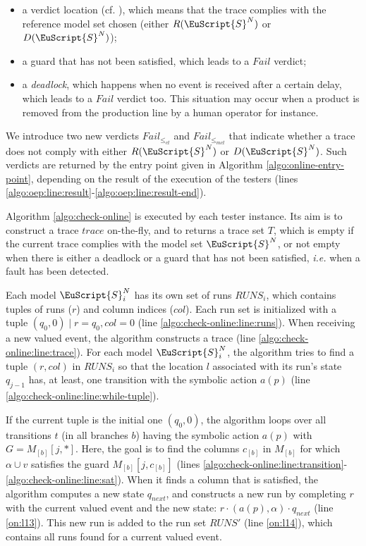 \begin{itemize}
    \item a verdict location (cf.
        ), which means
        that the trace complies with the reference model set
        chosen (either $R(\EuScript{S}^N)$ or
        $D(\EuScript{S}^N)$);

    \item a guard that has not been satisfied, which leads to a
        $Fail$ verdict;

    \item a \emph{deadlock}, which happens when no event is
        received after a certain delay, which leads to a $Fail$
        verdict too. This situation may occur when a product is
        removed from the production line by a human operator for
        instance.
\end{itemize}

We introduce two new verdicts $Fail_{\leq_{ct}}$ and
$Fail_{\leq_{mct}}$ that indicate whether a trace does not comply
with either $R(\EuScript{S}^N)$ or $D(\EuScript{S}^N)$. Such
verdicts are returned by the entry point given in Algorithm
\ref{algo:online-entry-point}, depending on the result of the
execution of the testers (lines
\ref{algo:oep:line:result}-\ref{algo:oep:line:result-end}).

Algorithm \ref{algo:check-online} is executed by each tester
instance. Its aim is to construct a trace $trace$ on-the-fly, and
to returns a trace set $T$, which is empty if the current trace
complies with the model set $\EuScript{S}^N$, or not empty when
there is either a deadlock or a guard that has not been
satisfied, \emph{i.e.} when a fault has been detected.

Each model $\EuScript{S}_i^N$ has its own set of runs $RUNS_i$,
which contains tuples of runs ($r$) and column indices ($col$).
Each run set is initialized with a tuple $(q_0, 0) \mid r = q_0,
col = 0$ (line \ref{algo:check-online:line:runs}). When receiving
a new valued event, the algorithm constructs a trace (line
\ref{algo:check-online:line:trace}). For each model
$\EuScript{S}_i^N$, the algorithm tries to find a tuple $(r,
col)$ in $RUNS_i$ so that the location $l$ associated with its
run's state $q_{j - 1}$ has, at least, one transition with the
symbolic action $a(p)$ (line
\ref{algo:check-online:line:while-tuple}).

If the current tuple is the initial one $(q_0, 0)$,
the algorithm loops over all transitions $t$ (in all branches
$b$) having the symbolic action $a(p)$ with $G = M_{[b]}[j, *]$.
Here, the goal is to find the columns $c_{[b]}$ in $M_{[b]}$ for
which $\alpha \cup v$ satisfies the guard $M_{[b]}[j, c_{[b]}]$
(lines
\ref{algo:check-online:line:transition}-\ref{algo:check-online:line:sat}).
When it finds a column that is satisfied, the algorithm computes
a new state $q_{next}$, and constructs a new run by completing
$r$ with the current valued event and the new state: $r \cdot
(a(p), \alpha) \cdot q_{next}$ (line \ref{on:l13}). This new run is added
to the run set $RUNS'$ (line \ref{on:l14}), which contains all runs found
for a current valued event.

